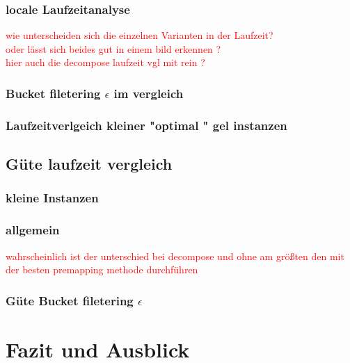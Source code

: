 \documentclass[11pt, a4paper, german]{article}
\begin{document}
\subsubsection{locale Laufzeitanalyse}
\textcolor{red}{wie unterscheiden sich die einzelnen Varianten in der Laufzeit? \\ oder lässt sich beides gut in einem bild erkennen ?} \\

\textcolor{red}{hier auch die decompose laufzeit vgl mit rein ?}

\subsubsection{Bucket filetering $\epsilon$ im vergleich } 
 
\subsubsection{Laufzeitverlgeich kleiner "optimal " gel instanzen}


\subsection{Güte laufzeit vergleich}
\subsubsection{kleine Instanzen}

\subsubsection{allgemein}
\textcolor{red}{wahrscheinlich ist der unterschied bei decompose und ohne am größten den mit der besten premapping methode durchführen}

\subsubsection{Güte Bucket filetering $\epsilon$ }

\section{Fazit und Ausblick}
\label{sec:fazit_und_ausblick}
	







\newpage
\end{document}
